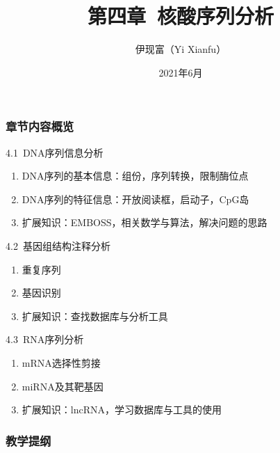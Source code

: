 




\title[核酸序列分析]{第四章\ 核酸序列分析}
\author[Yixf]{伊现富（Yi Xianfu）}
\date{2021年6月}

\begin{frame}
  \titlepage
\end{frame}

\begin{frame}
  \frametitle{章节内容概览}
  \begin{block}{4.1\ DNA序列信息分析}
    \begin{enumerate}
      \item DNA序列的基本信息：组份，序列转换，限制酶位点
      \item DNA序列的特征信息：开放阅读框，启动子，CpG岛
      \item 扩展知识：EMBOSS，相关数学与算法，解决问题的思路
    \end{enumerate}
  \end{block}
  \vspace{-0.2cm}
  \begin{block}{4.2\ 基因组结构注释分析}
    \begin{enumerate}
      \item 重复序列
      \item 基因识别
      \item 扩展知识：查找数据库与分析工具
    \end{enumerate}
  \end{block}
  \vspace{-0.2cm}
  \begin{block}{4.3\ RNA序列分析}
    \begin{enumerate}
      \item mRNA选择性剪接
      \item miRNA及其靶基因
      \item 扩展知识：lncRNA，学习数据库与工具的使用
    \end{enumerate}
  \end{block}
\end{frame}

\begin{frame}[plain]
  \frametitle{教学提纲}
  \setcounter{tocdepth}{2}
  \begin{multicols}{2}
  \tableofcontents
  \end{multicols}
\end{frame}









